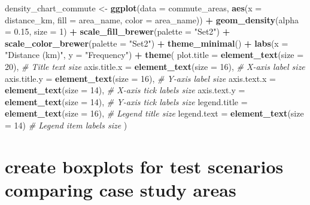 \documentclass[
]{article}
\newenvironment{Shaded}{\begin{snugshade}}{\end{snugshade}}
\newcommand{\AttributeTok}[1]{\textcolor[rgb]{0.13,0.29,0.53}{#1}}
\newcommand{\CommentTok}[1]{\textcolor[rgb]{0.56,0.35,0.01}{\textit{#1}}}
\newcommand{\DecValTok}[1]{\textcolor[rgb]{0.00,0.00,0.81}{#1}}
\newcommand{\FloatTok}[1]{\textcolor[rgb]{0.00,0.00,0.81}{#1}}
\newcommand{\FunctionTok}[1]{\textcolor[rgb]{0.13,0.29,0.53}{\textbf{#1}}}
\newcommand{\NormalTok}[1]{#1}
\newcommand{\OtherTok}[1]{\textcolor[rgb]{0.56,0.35,0.01}{#1}}
\newcommand{\SpecialCharTok}[1]{\textcolor[rgb]{0.81,0.36,0.00}{\textbf{#1}}}
\newcommand{\StringTok}[1]{\textcolor[rgb]{0.31,0.60,0.02}{#1}}
\begin{document}
\begin{Shaded}
\begin{Highlighting}[]
\NormalTok{density\_chart\_commute }\OtherTok{\textless{}{-}} \FunctionTok{ggplot}\NormalTok{(}\AttributeTok{data =}\NormalTok{ commute\_areas, }\FunctionTok{aes}\NormalTok{(}\AttributeTok{x =}\NormalTok{ distance\_km, }\AttributeTok{fill =}\NormalTok{ area\_name, }\AttributeTok{color =}\NormalTok{ area\_name)) }\SpecialCharTok{+}
  \FunctionTok{geom\_density}\NormalTok{(}\AttributeTok{alpha =} \FloatTok{0.15}\NormalTok{, }\AttributeTok{size =} \DecValTok{1}\NormalTok{) }\SpecialCharTok{+} 
  \FunctionTok{scale\_fill\_brewer}\NormalTok{(}\AttributeTok{palette =} \StringTok{"Set2"}\NormalTok{) }\SpecialCharTok{+} 
  \FunctionTok{scale\_color\_brewer}\NormalTok{(}\AttributeTok{palette =} \StringTok{"Set2"}\NormalTok{) }\SpecialCharTok{+} 
  \FunctionTok{theme\_minimal}\NormalTok{() }\SpecialCharTok{+}
  \FunctionTok{labs}\NormalTok{(}\AttributeTok{x =} \StringTok{"Distance (km)"}\NormalTok{, }\AttributeTok{y =} \StringTok{"Frequency"}\NormalTok{) }\SpecialCharTok{+} 
  \FunctionTok{theme}\NormalTok{(}
  \AttributeTok{plot.title =} \FunctionTok{element\_text}\NormalTok{(}\AttributeTok{size =} \DecValTok{20}\NormalTok{),       }\CommentTok{\# Title text size}
  \AttributeTok{axis.title.x =} \FunctionTok{element\_text}\NormalTok{(}\AttributeTok{size =} \DecValTok{16}\NormalTok{),      }\CommentTok{\# X{-}axis label size}
  \AttributeTok{axis.title.y =} \FunctionTok{element\_text}\NormalTok{(}\AttributeTok{size =} \DecValTok{16}\NormalTok{),      }\CommentTok{\# Y{-}axis label size}
  \AttributeTok{axis.text.x =} \FunctionTok{element\_text}\NormalTok{(}\AttributeTok{size =} \DecValTok{14}\NormalTok{),       }\CommentTok{\# X{-}axis tick labels size}
  \AttributeTok{axis.text.y =} \FunctionTok{element\_text}\NormalTok{(}\AttributeTok{size =} \DecValTok{14}\NormalTok{),       }\CommentTok{\# Y{-}axis tick labels size}
  \AttributeTok{legend.title =} \FunctionTok{element\_text}\NormalTok{(}\AttributeTok{size =} \DecValTok{16}\NormalTok{),      }\CommentTok{\# Legend title size}
  \AttributeTok{legend.text =} \FunctionTok{element\_text}\NormalTok{(}\AttributeTok{size =} \DecValTok{14}\NormalTok{)        }\CommentTok{\# Legend item labels size}
\NormalTok{  )}
\end{Highlighting}
\end{Shaded}

\section{create boxplots for test scenarios comparing case study
areas}\label{create-boxplots-for-test-scenarios-comparing-case-study-areas}
\end{document}
